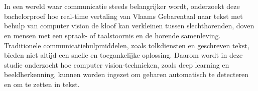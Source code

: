 
%
%
%
%
%

%



\chapter*{}

In een wereld waar communicatie steeds belangrijker wordt, onderzoekt deze bachelorproef hoe real-time vertaling van Vlaams Gebarentaal naar tekst met behulp van computer vision de kloof kan verkleinen tussen slechthorenden, doven en mensen met een spraak- of taalstoornis en de horende samenleving. 
Traditionele communicatiehulpmiddelen, zoals tolkdiensten en geschreven tekst, bieden niet altijd een snelle en toegankelijke oplossing. 
Daarom wordt in deze studie onderzocht hoe computer vision-technieken, zoals deep learning en beeldherkenning, kunnen worden ingezet om gebaren automatisch te detecteren en om te zetten in tekst.

